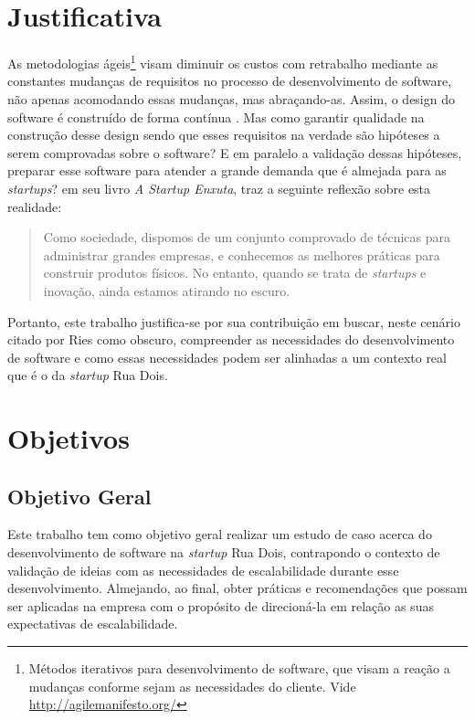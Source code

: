 \section{Justificativa}

As metodologias ágeis\footnote{Métodos iterativos para desenvolvimento de software,
que visam a reação a mudanças conforme sejam as necessidades do cliente. Vide
\url{http://agilemanifesto.org/}} visam diminuir os custos com retrabalho mediante as
constantes mudanças de requisitos no processo de desenvolvimento de software,
não apenas acomodando essas mudanças, mas abraçando-as. Assim, o design do
software é construído de forma contínua \cite{AgileSoftwareInnovation}.
Mas como garantir qualidade na construção desse design sendo que esses requisitos
na verdade são hipóteses a serem comprovadas sobre o software? E em paralelo
a validação dessas hipóteses, preparar esse software para atender a grande
demanda que é almejada para as \textit{startups}? 
em seu livro \textit{A Startup Enxuta}, traz a seguinte reflexão sobre esta
realidade:

  \begin{quotation}{}{}
    Como sociedade, dispomos de um conjunto comprovado de técnicas para
    administrar grandes empresas, e conhecemos as melhores práticas para
    construir produtos físicos. No entanto, quando se trata de \textit{startups}
    e inovação, ainda estamos atirando no escuro.
  \end{quotation}

Portanto, este trabalho justifica-se por sua contribuição em buscar, neste
cenário citado por Ries como obscuro, compreender as necessidades do desenvolvimento
de software e como essas necessidades podem ser alinhadas a um contexto real
que é o da \textit{startup} Rua Dois.

\section{Objetivos}

\subsection{Objetivo Geral}

Este trabalho tem como objetivo geral realizar um estudo de caso acerca do
desenvolvimento de software na \textit{startup} Rua Dois, contrapondo o contexto de
validação de ideias com as necessidades de escalabilidade durante esse
desenvolvimento. Almejando, ao final, obter práticas e recomendações que possam
ser aplicadas na empresa com o propósito de direcioná-la em relação as suas
expectativas de escalabilidade.

